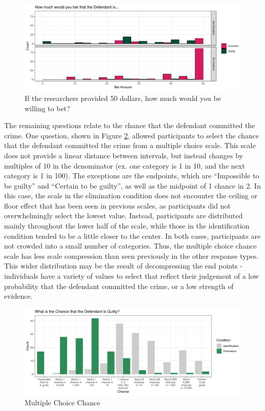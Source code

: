 \documentclass[print]{nuthesis}
\begin{document}
\begin{figure}

{\centering \includegraphics[width=\linewidth]{thesis_files/figure-latex/betting-1} 

}

\caption{If the researchers provided 50 dollars, how much would you be willing to bet?}\label{fig:betting}
\end{figure}

The remaining questions relate to the chance that the defendant committed the crime.
One question, shown in Figure \ref{fig:fixedlike}, allowed participants to select the chance that the defendant committed the crime from a multiple choice scale.
This scale does not provide a linear distance between intervals, but instead changes by multiples of 10 in the denominator (ex. one category is 1 in 10, and the next category is 1 in 100).
The exceptions are the endpoints, which are ``Impossible to be guilty'' and ``Certain to be guilty'', as well as the midpoint of 1 chance in 2.
In this case, the scale in the elimination condition does not encounter the ceiling or floor effect that has been seen in previous scales, as participants did not overwhelmingly select the lowest value.
Instead, participants are distributed mainly throughout the lower half of the scale, while those in the identification condition tended to be a little closer to the center.
In both cases, participants are not crowded into a small number of categories.
Thus, the multiple choice chance scale has less scale compression than seen previously in the other response types.
This wider distribution may be the result of decompressing the end points - individuals have a variety of values to select that reflect their judgement of a low probability that the defendant committed the crime, or a low strength of evidence.

\begin{figure}

{\centering \includegraphics[width=\linewidth]{thesis_files/figure-latex/fixedlike-1} 

}

\caption{Multiple Choice Chance}\label{fig:fixedlike}
\end{figure}
\end{document}

